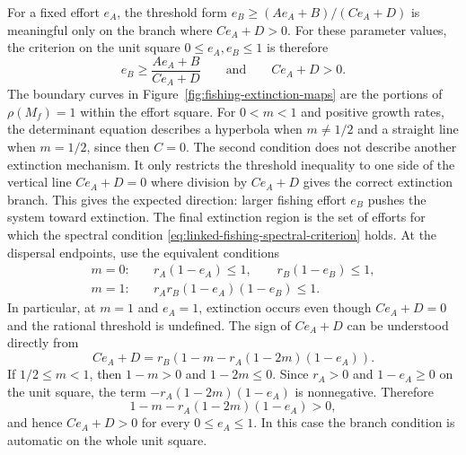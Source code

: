 \documentclass{article}
\numberwithin{equation}{section}
\begin{document}
For a fixed effort $e_A$, the threshold form
$e_B\geq(Ae_A+B)/(Ce_A+D)$ is meaningful only on the branch where
$Ce_A+D>0$. For these parameter values, the criterion on the unit square
$0\leq e_A,e_B\leq1$ is therefore
\begin{equation}
    \label{eq:linked-fishing-eb-threshold}
    e_B\geq\frac{Ae_A+B}{Ce_A+D}
    \qquad\text{and}\qquad
    Ce_A+D>0.
\end{equation}
The boundary curves in Figure~\ref{fig:fishing-extinction-maps} are the
portions of $\rho(M_f)=1$ within the effort square. For $0<m<1$ and
positive growth rates, the determinant equation describes a hyperbola
when $m\ne 1/2$ and a straight line when $m=1/2$, since then $C=0$.
The second condition does not describe another extinction mechanism. It
only restricts the threshold inequality to one side of the vertical line
$Ce_A+D=0$ where division by $Ce_A+D$ gives the correct extinction
branch. This gives the expected direction: larger fishing effort $e_B$
pushes the system toward extinction. The final extinction region is the
set of efforts for which the spectral condition
\eqref{eq:linked-fishing-spectral-criterion} holds.
At the dispersal endpoints, use the equivalent conditions
\begin{equation*}
    \begin{aligned}
    m=0:&\quad r_A(1-e_A)\leq1,\qquad r_B(1-e_B)\leq1,\\
    m=1:&\quad r_Ar_B(1-e_A)(1-e_B)\leq1.
    \end{aligned}
\end{equation*}
In particular, at $m=1$ and $e_A=1$, extinction occurs even though
$Ce_A+D=0$ and the rational threshold is undefined.
The sign of $Ce_A+D$ can be understood directly from
\begin{equation*}
    Ce_A+D
    =
    r_B\left(1-m-r_A(1-2m)(1-e_A)\right).
\end{equation*}
If $1/2\leq m<1$, then $1-m>0$ and $1-2m\leq0$. Since
$r_A>0$ and $1-e_A\geq0$ on the unit square, the term
$-r_A(1-2m)(1-e_A)$ is nonnegative. Therefore
\begin{equation*}
    1-m-r_A(1-2m)(1-e_A)>0,
\end{equation*}
and hence $Ce_A+D>0$ for every $0\leq e_A\leq1$. In this case the
branch condition is automatic on the whole unit square.
\end{document}
